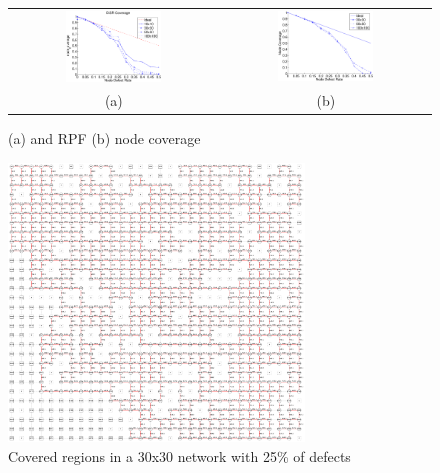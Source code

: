 \begin{figure}
\centering
\begin{tabular}{cc}
\includegraphics[width=0.48\textwidth]{pictures/set1.eps} & 
\includegraphics[width=0.48\textwidth]{pictures/coverage.eps} \\
(a) & (b) 
\end{tabular}
\caption{\disr{} (a) and RPF (b) node coverage}
\label{fig:results_coverage}
\end{figure}

\begin{figure}
\centering
\includegraphics[width=0.70\textwidth]{pictures/net.ps}
\caption{Covered regions in a 30x30 network with 25\% of defects}
\label{fig:net}
\end{figure}

